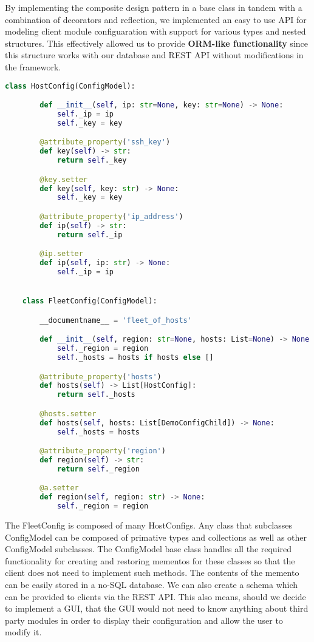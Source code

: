 By implementing the composite design pattern in a base class in tandem with a combination of decorators and
reflection, we implemented an easy to use API for modeling client module configuaration with support for various
types and nested structures. This effectively allowed us to provide \textbf{ORM-like functionality} since this
structure works with our database and REST API without modifications in the framework.

\begin{lstlisting}[language=Python]
	class HostConfig(ConfigModel):

	    def __init__(self, ip: str=None, key: str=None) -> None:
	        self._ip = ip
	        self._key = key

	    @attribute_property('ssh_key')
	    def key(self) -> str:
	        return self._key

	    @key.setter
	    def key(self, key: str) -> None:
	        self._key = key

	    @attribute_property('ip_address')
	    def ip(self) -> str:
	        return self._ip

	    @ip.setter
	    def ip(self, ip: str) -> None:
	        self._ip = ip


	class FleetConfig(ConfigModel):

	    __documentname__ = 'fleet_of_hosts'

	    def __init__(self, region: str=None, hosts: List=None) -> None:
	        self._region = region
	        self._hosts = hosts if hosts else []

	    @attribute_property('hosts')
	    def hosts(self) -> List[HostConfig]:
	        return self._hosts

	    @hosts.setter
	    def hosts(self, hosts: List[DemoConfigChild]) -> None:
	        self._hosts = hosts

	    @attribute_property('region')
	    def region(self) -> str:
	        return self._region

	    @a.setter
	    def region(self, region: str) -> None:
	        self._region = region
\end{lstlisting}

The FleetConfig is composed of many HostConfigs. Any class that subclasses ConfigModel can be composed of
primative types and collections as well as other ConfigModel subclasses. The ConfigModel base class handles
all the required functionality for creating and restoring mementos for these classes so that the client does
not need to implement such methods. The contents of the memento can be easily stored in a no-SQL database.
We can also create a schema which can be provided to clients via the REST API. This also means, should we
decide to implement a GUI, that the GUI would not need to know anything about third party modules in order
to display their configuration and allow the user to modify it.

